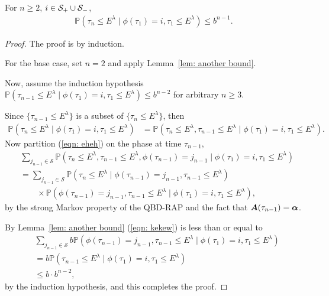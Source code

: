 \begin{lem}\label{lem: another bound 2}
	For \(n\geq 2\), \(i\in\mathcal S_+\cup \mathcal{S}_-\), 
	\begin{align}
		\mathbb P(\tau_n \leq E^\lambda \mid \phi(\tau_1) = i, \tau_1\leq E^\lambda) \leq b^{n-1}.
	\end{align}
\end{lem}
\begin{proof}
	The proof is by induction. 
	
	For the base case, set \(n=2\) and apply Lemma~\ref{lem: another bound}.

	Now, assume the induction hypothesis \(\mathbb P(\tau_{n-1} \leq E^\lambda \mid \phi(\tau_1) = i, \tau_1\leq E^\lambda) \leq b^{n-2}\) for arbitrary \(n\geq 3\). 
	
	Since \(\{\tau_{n-1}\leq E^\lambda\}\) is a subset of \(\{\tau_{n}\leq E^\lambda\}\), then 
	\begin{align}
		 \mathbb P(   \tau_n \leq E^\lambda \mid \phi(\tau_1) = i, \tau_1\leq E^\lambda)
		&= \mathbb P(   \tau_n \leq E^\lambda,  \tau_{n-1} \leq E^\lambda  \mid \phi(\tau_1) = i, \tau_1\leq E^\lambda). \label{eqn: eheh}
	\end{align}
	Now partition (\ref{eqn: eheh}) on the phase at time \(\tau_{n-1}\),
	\begin{align}
		\nonumber&\sum_{j_{n-1}\in\mathcal S}\mathbb P(  \tau_n \leq E^\lambda,  \tau_{n-1} \leq E^\lambda,\phi(\tau_{n-1}) = j_{n-1} \mid \phi(\tau_1) = i, \tau_1\leq E^\lambda)
		\\&\nonumber=  \sum_{j_{n-1}\in\mathcal S}\mathbb P(  \tau_{n}\leq E^\lambda\mid   \phi(\tau_{n-1}) = j_{n-1}, \tau_{n-1} \leq E^\lambda)
		\\&\qquad\times\mathbb P( \phi(\tau_{n-1}) = j_{n-1}, \tau_{n-1}\leq E^\lambda \mid \phi(\tau_1) = i, \tau_1\leq E^\lambda), \label{eqn: kekew}
	\end{align}
	by the strong Markov property of the QBD-RAP and the fact that \(\boldsymbol A(\tau_{n-1})=\boldsymbol \alpha\). 
	 
	By Lemma~\ref{lem: another bound} (\ref{eqn: kekew}) is less than or equal to 
	\begin{align}
		&\sum_{j_{n-1}\in\mathcal S} b
		\mathbb P(  \phi(\tau_{n-1}) = j_{n-1}, \tau_{n-1}\leq E^\lambda\mid \phi(\tau_1) = i, \tau_1\leq E^\lambda) \nonumber
		\\&= b
		\mathbb P( \tau_{n-1}\leq E^\lambda\mid \phi(\tau_1) = i, \tau_1\leq E^\lambda)\nonumber
		\\&\leq b\cdot b^{n-2},
	\end{align}
	by the induction hypothesis, and this completes the proof. 
\end{proof}
%

